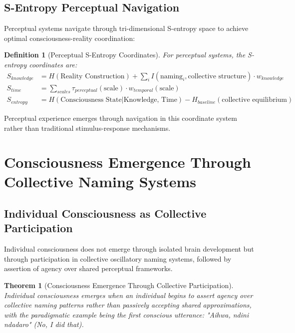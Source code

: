 \documentclass[12pt,a4paper]{article}
\newtheorem{theorem}{Theorem}
\newtheorem{definition}{Definition}
\begin{document}
\subsection{S-Entropy Perceptual Navigation}

Perceptual systems navigate through tri-dimensional S-entropy space to achieve optimal consciousness-reality coordination:

\begin{definition}[Perceptual S-Entropy Coordinates]
For perceptual systems, the S-entropy coordinates are:
\begin{align}
S_{knowledge} &= H(\text{Reality Construction}) + \sum_i I(\text{naming}_i, \text{collective structure}) \cdot w_{knowledge} \\
S_{time} &= \sum_{scales} \tau_{perceptual}(\text{scale}) \cdot w_{temporal}(\text{scale}) \\
S_{entropy} &= H(\text{Consciousness State}|\text{Knowledge, Time}) - H_{baseline}(\text{collective equilibrium})
\end{align}
\end{definition}

Perceptual experience emerges through navigation in this coordinate system rather than traditional stimulus-response mechanisms.

\section{Consciousness Emergence Through Collective Naming Systems}

\subsection{Individual Consciousness as Collective Participation}

Individual consciousness does not emerge through isolated brain development but through participation in collective oscillatory naming systems, followed by assertion of agency over shared perceptual frameworks.

\begin{theorem}[Consciousness Emergence Through Collective Participation]
Individual consciousness emerges when an individual begins to assert agency over collective naming patterns rather than passively accepting shared approximations, with the paradigmatic example being the first conscious utterance: "Aihwa, ndini ndadaro" (No, I did that).
\end{theorem}
\end{document}
